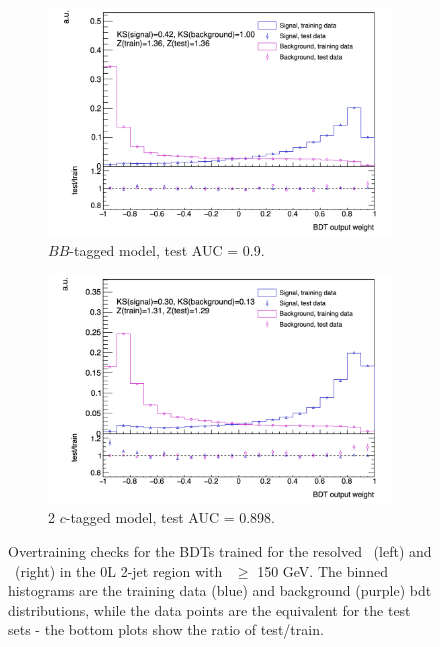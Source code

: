 \begin{figure}[h!]
  \hspace{-0.3cm}
  \begin{subfigure}[b]{0.49\textwidth}
      \centering
    \includegraphics[width=\textwidth]{Images/VH/Discriminants/0Lbb.png}
  \caption{$BB$-tagged model, test AUC = 0.9.} 
  \end{subfigure}
  \begin{subfigure}[b]{0.49\textwidth}
      \centering
    \includegraphics[width=\textwidth]{Images/VH/Discriminants/0Lcc.png}
    \caption{2 $c$-tagged model, test AUC = 0.898.}
  \end{subfigure}
  \caption{Overtraining checks for the BDTs trained for the resolved \vhb\ (left) and \vhc\ (right) in the 0L 2-jet region with \ptv\ $\geq$ 150 GeV. The binned histograms are the training data (blue) and background (purple) \gls{bdt} distributions, while the data points are the equivalent for the test sets - the bottom plots show the ratio of test/train.}
  \label{fig:overtrainingCheck}
\end{figure}

